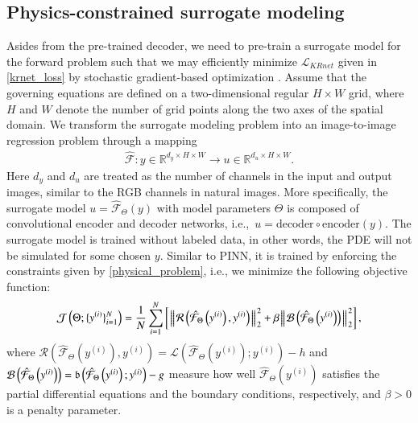 \subsection{Physics-constrained surrogate modeling}
Asides from the pre-trained decoder, we need to pre-train a surrogate model for the forward problem such that we may efficiently minimize $\mathcal{L}_{KRnet}$ given in  \eqref{krnet_loss} by stochastic gradient-based optimization \cite{bottou2018optimization}.
Assume that the governing %
equations are defined on a two-dimensional regular $H\times W$ grid, where $H$ and $W$ denote the number of grid points along the two axes of the spatial domain. We transform the surrogate modeling problem into an image-to-image regression problem through a mapping 
\begin{align}\label{surroagte_map}
	\hat{\mathcal{F}}:y\in \mathbb{R}^{d_y\times H\times W }\to u\in \mathbb{R}^{d_u\times H\times W }.
\end{align}
Here $d_y$ and $d_u$ are treated as the number of channels in the input and output images, similar to the RGB channels in natural images. More specifically, the surrogate model $u=\hat{\mathcal{F}}_{\Theta}(y)$ with model parameters $\Theta$ is composed of convolutional encoder and decoder networks, i.e.,\ $u=\text{decoder}\circ\text{encoder}(y)$. The surrogate model is trained without labeled data, in other words, the PDE will not be simulated for some chosen $y$. Similar to PINN, it is trained \cite{raissi2019physics} by enforcing the constraints given by  \eqref{physical_problem}, i.e., we minimize the following objective function:
\begin{align}\label{surrogate_loss}
	\mathcal{J}\left(\Theta;\{y^{(i)}\}_{i=1}^N\right)=\frac{1}{N}\sum_{i=1}^N\left[ {\left\Arrowvert \mathcal{R}\left(\hat{\mathcal{F}}_{\Theta}\left(y^{(i)}\right),y^{(i)}\right)\right\Arrowvert}_2^2+\beta{\left\Arrowvert\mathcal{B}\left(\hat{\mathcal{F}}_{\Theta}\left(y^{(i)}\right)\right)\right\Arrowvert}_2^2\right],
\end{align}
where 
$\mathcal{R}\left(\hat{\mathcal{F}}_{\Theta}\left(y^{(i)}\right),y^{(i)}\right)=\mathcal{L}\left(\hat{\mathcal{F}}_{\Theta}\left(y^{(i)}\right);y^{(i)}\right)-h$ and $\mathcal{B}\left(\hat{\mathcal{F}}_{\Theta}\left(y^{(i)}\right)\right)=\mathfrak{b}\left(\hat{\mathcal{F}}_{\Theta}\left(y^{(i)}\right);y^{(i)}\right)-g$ measure how well $\hat{\mathcal{F}}_{\Theta}\left(y^{(i)}\right)$ satisfies the partial differential equations and the boundary conditions, respectively, and $\beta>0$ is a penalty parameter. %
